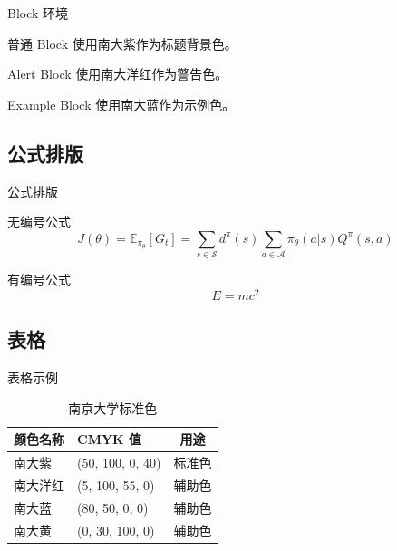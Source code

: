 \documentclass[10pt]{beamer}
\begin{document}
\begin{frame}{Block 环境}
  \begin{block}{普通 Block}
    使用南大紫作为标题背景色。
  \end{block}

  \begin{alertblock}{Alert Block}
    使用南大洋红作为警告色。
  \end{alertblock}

  \begin{exampleblock}{Example Block}
    使用南大蓝作为示例色。
  \end{exampleblock}
\end{frame}

\subsection{公式排版}

\begin{frame}{公式排版}
  \begin{block}{无编号公式}
    \[
      J(\theta) = \mathbb{E}_{\pi_\theta}[G_t]
        = \sum_{s \in \mathcal{S}} d^\pi(s)
          \sum_{a \in \mathcal{A}} \pi_\theta(a|s) Q^\pi(s,a)
    \]
  \end{block}
  \begin{block}{有编号公式}
    \begin{equation}
      E = mc^2
    \end{equation}
  \end{block}
\end{frame}

\subsection{表格}

\begin{frame}{表格示例}
  \begin{table}[htbp]
    \centering
    \caption{南京大学标准色}
    \label{tab:njucolors}
    \begin{tabular}{llc}
      \toprule
      颜色名称 & CMYK 值 & 用途 \\
      \midrule
      南大紫 & (50, 100, 0, 40) & 标准色 \\
      南大洋红 & (5, 100, 55, 0) & 辅助色 \\
      南大蓝 & (80, 50, 0, 0) & 辅助色 \\
      南大黄 & (0, 30, 100, 0) & 辅助色 \\
      \bottomrule
    \end{tabular}
  \end{table}
\end{frame}
\end{document}
